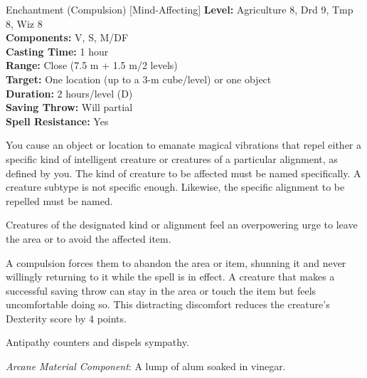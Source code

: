 {Enchantment (Compulsion) [Mind-Affecting]}
{
	\textbf{Level:}
	Agriculture 8, Drd 9, Tmp 8, Wiz 8\\
	\textbf{Components:}
	V, S, M/DF\\
	\textbf{Casting Time:}
	1 hour\\
	\textbf{Range:}
	Close (7.5 m + 1.5 m/2 levels)\\
	\textbf{Target:}
	One location (up to a 3-m cube/level) or one object\\
	\textbf{Duration:}
	2 hours/level (D)\\
	\textbf{Saving Throw:}
	Will partial\\
	\textbf{Spell Resistance:}
	Yes\\
}
{
	You cause an object or location to emanate magical vibrations that repel either a specific kind of intelligent creature or creatures of a particular alignment, as defined by you. The kind of creature to be affected must be named specifically. A creature subtype is not specific enough. Likewise, the specific alignment to be repelled must be named.

	Creatures of the designated kind or alignment feel an overpowering urge to leave the area or to avoid the affected item.

	A compulsion forces them to abandon the area or item, shunning it and never willingly returning to it while the spell is in effect. A creature that makes a successful saving throw can stay in the area or touch the item but feels uncomfortable doing so. This distracting discomfort reduces the creature's Dexterity score by 4 points.

	Antipathy counters and dispels sympathy.

	\textit{Arcane Material Component}:
	A lump of alum soaked in vinegar.

}
